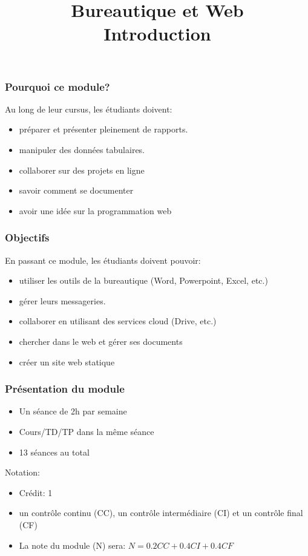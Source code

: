 \documentclass{beamer}
\title[BWEB: Introduction] %
{Bureautique et Web \\Introduction}
\begin{document}
\begin{frame}
\frametitle{Pourquoi ce module?}

Au long de leur cursus, les étudiants doivent:
\begin{itemize}
	\item préparer et présenter pleinement de rapports.
	\item manipuler des données tabulaires.
	\item collaborer sur des projets en ligne
	\item savoir comment se documenter
	\item avoir une idée sur la programmation web
\end{itemize}

\end{frame}


\begin{frame}
	\frametitle{Objectifs}
	En passant ce module, les étudiants doivent pouvoir:
	\begin{itemize}
		\item utiliser les outils de la bureautique (Word, Powerpoint, Excel, etc.)
		\item gérer leurs messageries.
		\item collaborer en utilisant des services cloud (Drive, etc.)
		\item chercher dans le web et gérer ses documents
		\item créer un site web statique
	\end{itemize}

\end{frame}


\begin{frame}
\frametitle{Présentation du module}

\begin{itemize}
	\item Un séance de 2h par semaine
	\item Cours/TD/TP dans la même séance  
	\item 13 séances au total
\end{itemize}

Notation:
\begin{itemize}
	\item Crédit: 1
	\item un contrôle continu (CC), un contrôle intermédiaire (CI) et un contrôle final (CF)
	\item La note du module (N) sera: $ N = 0.2 CC + 0.4 CI + 0.4 CF$
\end{itemize}

\end{frame}
\end{document}
